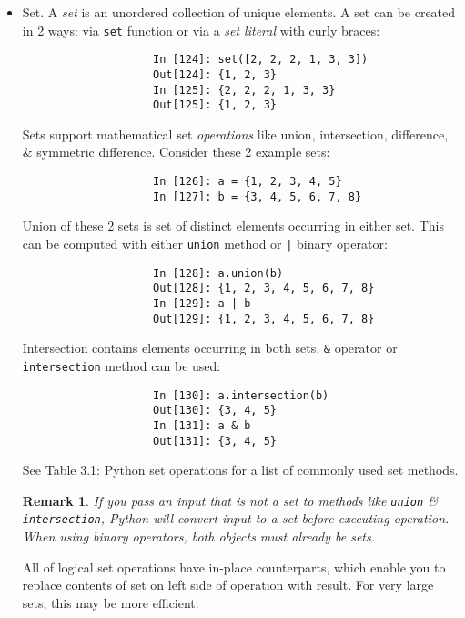 \documentclass{article}
\newtheorem{remark}{Remark}
\begin{document}
\begin{enumerate}
\begin{itemize}
\begin{itemize}
\begin{itemize}
\begin{itemize}
					To use a list as a key, 1 option: convert it to a tuple, which can be hashed as long as its elements also can be:
					\begin{verbatim}
						In [121]: d = {}
						In [122]: d[tuple([1, 2, 3])] = 5
						In [123]: d
						Out[123]: {(1, 2, 3): 5}
					\end{verbatim}
				\end{itemize}
				\item {\sf Set.} A {\it set} is an unordered collection of unique elements. A set can be created in 2 ways: via {\tt set} function or via a {\it set literal} with curly braces:
				\begin{verbatim}
					In [124]: set([2, 2, 2, 1, 3, 3])
					Out[124]: {1, 2, 3}
					In [125]: {2, 2, 2, 1, 3, 3}
					Out[125]: {1, 2, 3}
				\end{verbatim}
				Sets support mathematical set {\it operations} like union, intersection, difference, \& symmetric difference. Consider these 2 example sets:
				\begin{verbatim}
					In [126]: a = {1, 2, 3, 4, 5}
					In [127]: b = {3, 4, 5, 6, 7, 8}
				\end{verbatim}
				Union of these 2 sets is set of distinct elements occurring in either set. This can be computed with either {\tt union} method or {\tt|} binary operator:
				\begin{verbatim}
					In [128]: a.union(b)
					Out[128]: {1, 2, 3, 4, 5, 6, 7, 8}
					In [129]: a | b
					Out[129]: {1, 2, 3, 4, 5, 6, 7, 8}
				\end{verbatim}
				Intersection contains elements occurring in both sets. {\tt\&} operator or {\tt intersection} method can be used:
				\begin{verbatim}
					In [130]: a.intersection(b)
					Out[130]: {3, 4, 5}
					In [131]: a & b
					Out[131]: {3, 4, 5}
				\end{verbatim}
				See {\sf Table 3.1: Python set operations} for a list of commonly used set methods.				
				\begin{remark}
					If you pass an input that is not a set to methods like {\tt union} \& {\tt intersection}, Python will convert input to a set before executing operation. When using binary operators, both objects must already be sets.
				\end{remark}
				All of logical set operations have in-place counterparts, which enable you to replace contents of set on left side of operation with result. For very large sets, this may be more efficient:
				\begin{verbatim}

\end{verbatim}
\end{itemize}
\end{itemize}
\end{itemize}
\end{enumerate}
\end{document}

